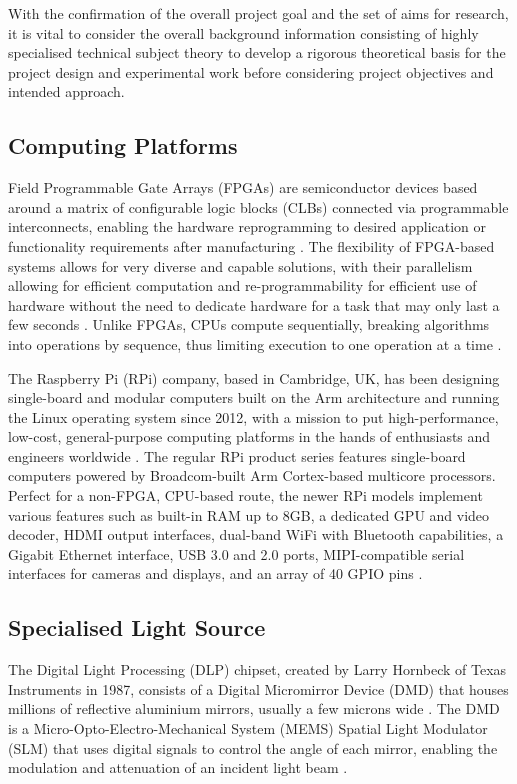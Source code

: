 With the confirmation of the overall project goal and the set of aims for research, it is vital to consider the overall background information consisting of highly specialised technical subject theory to develop a rigorous theoretical basis for the project design and experimental work before considering project objectives and intended approach.

\subsection{Computing Platforms}
Field Programmable Gate Arrays (FPGAs) are semiconductor devices based around a matrix of configurable logic blocks (CLBs) connected via programmable interconnects, enabling the hardware reprogramming to desired application or functionality requirements after manufacturing \cite{WhatFPGAField}. The flexibility of FPGA-based systems allows for very diverse and capable solutions, with their parallelism allowing for efficient computation and re-programmability for efficient use of hardware without the need to dedicate hardware for a task that may only last a few seconds \cite{villalpandoReconfigurableMachineVision2010}. Unlike FPGAs, CPUs compute sequentially, breaking algorithms into operations by sequence, thus limiting execution to one operation at a time \cite{alexliangBoostingMachineVision2016}.

The Raspberry Pi (RPi) company, based in Cambridge, UK, has been designing single-board and modular computers built on the Arm architecture and running the Linux operating system since 2012, with a mission to put high-performance, low-cost, general-purpose computing platforms in the hands of enthusiasts and engineers worldwide \cite{raspberrypiRaspberryPiUs}. The regular RPi product series features single-board computers powered by Broadcom-built Arm Cortex-based multicore processors. Perfect for a non-FPGA, CPU-based route, the newer RPi models implement various features such as built-in RAM up to 8GB, a dedicated GPU and video decoder, HDMI output interfaces, dual-band WiFi with Bluetooth capabilities, a Gigabit Ethernet interface, USB 3.0 and 2.0 ports, MIPI-compatible serial interfaces for cameras and displays, and an array of 40 GPIO pins \cite{raspberrypiltdBuyRaspberryPi, raspberrypiltdBuyRaspberryPia}.

\subsection{Specialised Light Source}
The Digital Light Processing (DLP) chipset, created by Larry Hornbeck of Texas Instruments in 1987, consists of a Digital Micromirror Device (DMD) that houses millions of reflective aluminium mirrors, usually a few microns wide \cite{DigitalLightProcessing2024, HowDoesDLP}. The DMD is a Micro-Opto-Electro-Mechanical System (MEMS) Spatial Light Modulator (SLM) that uses digital signals to control the angle of each mirror, enabling the modulation and attenuation of an incident light beam \cite{DLP4500DigitalMicromirror}.

